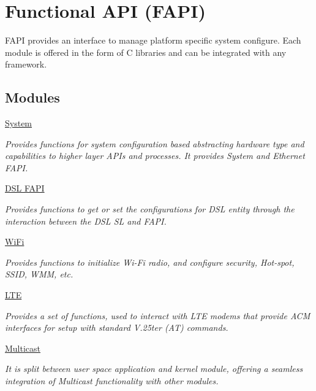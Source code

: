 \hypertarget{group__FAPI}{\section{Functional A\-P\-I (F\-A\-P\-I)}
\label{group__FAPI}
}


F\-A\-P\-I provides an interface to manage platform specific system configure. Each module is offered in the form of C libraries and can be integrated with any framework.  


\subsection*{Modules}
\begin{DoxyCompactItemize}
\item 
\hyperlink{group__FAPI__SYSTEM}{System}
\begin{DoxyCompactList}\small\item\em Provides functions for system configuration based abstracting hardware type and capabilities to higher layer A\-P\-Is and processes. It provides System and Ethernet F\-A\-P\-I. \end{DoxyCompactList}\item 
\hyperlink{group__FAPI__DSL}{D\-S\-L F\-A\-P\-I}
\begin{DoxyCompactList}\small\item\em Provides functions to get or set the configurations for D\-S\-L entity through the interaction between the D\-S\-L S\-L and F\-A\-P\-I. \end{DoxyCompactList}\item 
\hyperlink{group__FAPI__WLAN}{Wi\-Fi}
\begin{DoxyCompactList}\small\item\em Provides functions to initialize Wi-\/\-Fi radio, and configure security, Hot-\/spot, S\-S\-I\-D, W\-M\-M, etc. \end{DoxyCompactList}\item 
\hyperlink{group__FAPI__LTE}{L\-T\-E}
\begin{DoxyCompactList}\small\item\em Provides a set of functions, used to interact with L\-T\-E modems that provide A\-C\-M interfaces for setup with standard V.\-25ter (A\-T) commands. \end{DoxyCompactList}\item 
\hyperlink{group__FAPI__MCAST}{Multicast}
\begin{DoxyCompactList}\small\item\em It is split between user space application and kernel module, offering a seamless integration of Multicast functionality with other modules. \end{DoxyCompactList}\item 

\end{DoxyCompactItemize}
